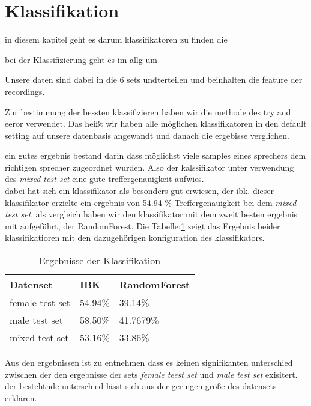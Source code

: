 \section{Klassifikation}

in diesem kapitel geht es darum klassifikatoren zu finden die 

bei der Klassifizierung geht es im allg um


Unsere daten sind dabei in die 6 sets undterteilen und beinhalten die feature der recordings.



Zur bestimmung der bessten klassifizieren haben wir die methode des try and eeror verwendet. Das heißt wir haben alle möglichen klassifikatoren in den default setting auf unsere datenbasis angewandt und danach die ergebisse verglichen.

ein gutes ergebnis bestand darin dass möglichst viele samples eines sprechers dem richtigen sprecher zugeordnet wurden. Also der kalssifikator unter verwendung des \textit{mixed test set} eine gute treffergenauigkeit aufwies.\\





dabei hat sich ein klassifikator als besonders gut erwiesen, der ibk. dieser klassifikator erzielte ein ergebnis von 54.94 \% Treffergenauigkeit bei dem 
\textit{mixed test set}.
als vergleich haben wir den klassifikator mit dem zweit besten ergebnis mit aufgeführt, der RandomForest. Die Tabelle:\ref{table:resultsClassifiers} zeigt das Ergebnis beider klassifikatioren mit den dazugehörigen konfiguration des klassifikators. \\


\begin{table}[h]
	\centering
    \begin{tabular}{ | l | l | l |}
    \hline
    Datenset & IBK & RandomForest  \\ \hline 
    female test set & 54.94\%  & 39.14\% \\ \hline
    male test set & 58.50\%  & 41.7679\% \\ \hline
    mixed test set & 53.16\%  & 33.86\% \\ \hline
    \end{tabular}
    \caption{Ergebnisse der Klassifikation}
   \label{table:resultsClassifiers}
\end{table}

Aus den ergebnissen ist zu entnehmen dass es keinen signifikanten unterschied zwischen der den ergebnisse der sets \textit{female teest set} und \textit{male test set} exisitert. der bestehtnde unterschied lässt sich aus der geringen größe des datensets erklären.\\



